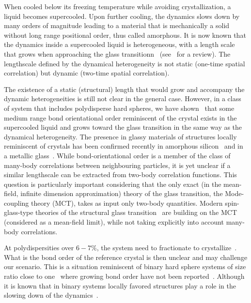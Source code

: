 \documentclass[twocolumn,superscriptaddress]{revtex4-1}
\begin{document}
When cooled below its freezing temperature while avoiding crystallization, a liquid becomes supercooled. Upon further cooling, the dynamics slows down by many orders of magnitude leading to a material that is mechanically a solid without long range positional order, thus called amorphous. It is now known that the dynamics inside a supercooled liquid is heterogeneous, with a length scale that grows when approaching the glass transitionn~\citep{yamamoto1998,Donati1999a} (see~\citep{BerthierR} for a review). The lengthscale defined by the dynamical heterogeneity is not static (one-time spatial correlation) but dynamic (two-time spatial correlation).

The existence of a static (structural) length that would grow and accompany the dynamic heterogeneities is still not clear in the general case. However, in a class of system that includes polydisperse hard spheres, we have shown~\cite{tanaka} that some medium range bond orientational order reminiscent of the crystal exists in the supercooled liquid and grows toward the glass transition in the same way as the dynamical heterogeneity. The presence in glassy materials of structures locally reminiscent of crystals has been confirmed recently in amorphous silicon~\cite{Treacy2012} and in a metallic glass~\cite{Hwang2012}. While bond-orientational order is a member of the class of many-body
correlations between neighbouring particles, it is yet unclear if a similar lengthscale can be extracted
from two-body correlation functions. This question is particularly important considering that the only exact (in the mean-field, infinite dimension approximation) theory of the glass transition, the Mode-coupling theory (MCT), takes as input only two-body quantities. Modern spin-glass-type theories of the structural glass transition~\cite{lubchenko2007,Biroli2008,Parisi2010} are building on the MCT (considered as a mean-field limit), while not taking explicitly into account many-body correlations.


At polydispersities over $6-7\%$, the system need to fractionate to crystallize~\citep{Fasolo2003}. What is the bond order of the reference crystal is then unclear and may challenge our scenario. This is a situation reminiscent of binary hard sphere systems of size ratio close to one~\cite{Hopkins2011b,Hopkins2012} where growing bond order have not been reported~\cite{Charbonneau}. Although it is known that in binary systems locally favored structures play a role in the slowing down of the dynamics~\cite{Coslovich2011,Malins2012}.
\end{document}
